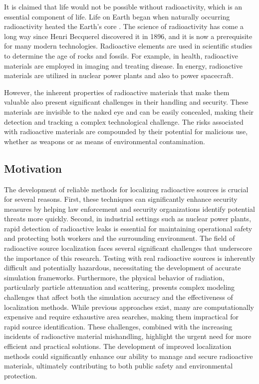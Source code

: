 \documentclass[../report.tex]{subfiles}
\begin{document}
    It is claimed that life would not be possible without radioactivity, which is an essential component of life. Life on Earth began when naturally occurring radioactivity heated
    the Earth's core \cite{DOEExplainsRadioactivity}. The science of radioactivity has come a long way since Henri Becquerel discovered it in 1896, and it is now a prerequisite for
    many modern technologies. Radioactive elements are used in scientific studies to determine the age of rocks and fossils. For example, in health, radioactive materials are
    employed in imaging and treating disease. In energy, radioactive materials are utilized in nuclear power plants and also to power spacecraft.


    However, the inherent properties of radioactive materials that make them valuable also present significant challenges in their handling and security. These materials are
    invisible to the naked eye and can be easily concealed, making their detection and tracking a complex technological challenge. The risks associated with radioactive materials
    are compounded by their potential for malicious use, whether as weapons or as means of environmental contamination.
    \subsection{Motivation}
    \label{sec:introduction:motivation}

    The development of reliable methods for localizing radioactive sources is crucial for several reasons. First, these techniques can significantly enhance security measures by 
    helping law enforcement and security organizations identify potential threats more quickly. Second, in industrial settings such as nuclear power plants, rapid detection of 
    radioactive leaks is essential for maintaining operational safety and protecting both workers and the surrounding environment.
    The field of radioactive source localization faces several significant challenges that underscore the importance of this research. Testing with real radioactive sources is 
    inherently difficult and potentially hazardous, necessitating the development of accurate simulation frameworks. Furthermore, the physical behavior of radiation, particularly
    particle attenuation and scattering, presents complex modeling challenges that affect both the simulation accuracy and the effectiveness of localization methods. While 
    previous approaches exist, many are computationally expensive and require exhaustive area searches, making them impractical for rapid source identification.
    These challenges, combined with the increasing incidents of radioactive material mishandling, highlight the urgent need for more efficient and practical solutions. The 
    development of improved localization methods could significantly enhance our ability to manage and secure radioactive materials, ultimately contributing to both public 
    safety and environmental protection.
\end{document}
